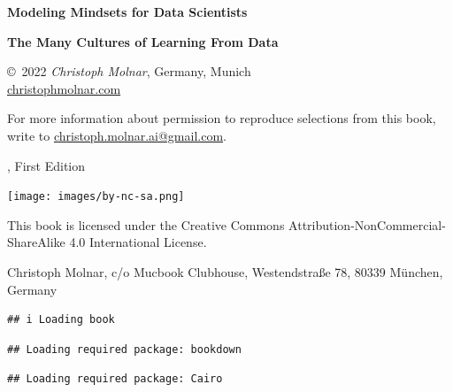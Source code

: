 \documentclass[
  10pt,
]{scrbook}
\begin{document}
\thispagestyle{empty}
\begin{center}
  {
  \bfseries \sffamily \LARGE Modeling Mindsets for Data Scientists \par
  \bfseries \small The Many Cultures of Learning From Data  \par
}

\copyright~2022 \textit{Christoph Molnar}, Germany, Munich\\
\url{christophmolnar.com}

For more information about permission to reproduce selections from this book, write to \url{christoph.molnar.ai@gmail.com}.

	\the\year, First Edition

\ifxetex
	\textsc{} 
\fi

\texttt{[image: images/by-nc-sa.png]}

This book is licensed under the Creative Commons Attribution-NonCommercial-ShareAlike 4.0 International License.
  
  Christoph Molnar,
  c/o Mucbook Clubhouse,
  Westendstraße 78,
  80339 München, Germany

\end{center}

\newpage
\thispagestyle{empty}
\mbox{}
\newpage








{
\hypersetup{linkcolor=}
\setcounter{tocdepth}{1}
\tableofcontents
}
\begin{verbatim}
## i Loading book
\end{verbatim}

\begin{verbatim}
## Loading required package: bookdown
\end{verbatim}

\begin{verbatim}
## Loading required package: Cairo
\end{verbatim}
\end{document}
